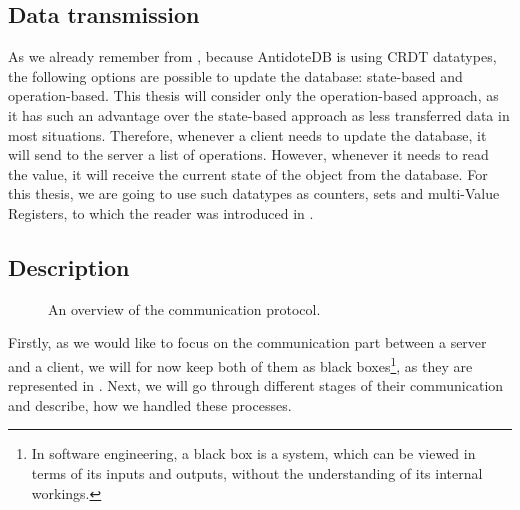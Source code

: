 
\subsection{Data transmission}

As we already remember from , because AntidoteDB is using CRDT datatypes, the following options are possible to update the database: state-based and operation-based. This thesis will consider only the operation-based approach, as it has such an advantage over the state-based approach as less transferred data in most situations. Therefore, whenever a client needs to update the database, it will send to the server a list of operations. However, whenever it needs to read the value, it will receive the current state of the object from the database. For this thesis, we are going to use such datatypes as counters, sets and multi-Value Registers, to which the reader was introduced in .

\subsection{Description} 

\begin{figure}[!htb]
    \begin{center}
    \def\svgwidth{0.6\linewidth}
    
    \caption {An overview of the communication protocol.}
    \label{fig:protocol1}
\end{center}
\end{figure}

Firstly, as we would like to focus on the communication part between a server and a client, we will for now keep both of them as black boxes\footnote{In software engineering, a black box is a system, which can be viewed in terms of its inputs and outputs, without the understanding of its internal workings.\cite{49}}, as they are represented in . Next, we will go through different stages of their communication and describe, how we handled these processes. 

